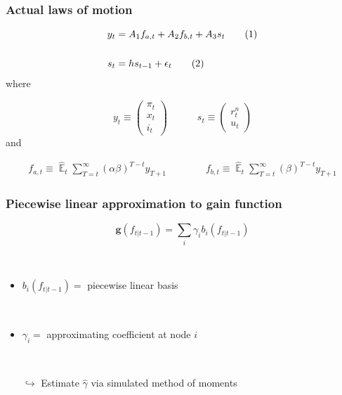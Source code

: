 \documentclass[10pt]{beamer}
\newcommand\numberthis{\addtocounter{equation}{1}\tag{\theequation}} %
\DeclareMathOperator{\E}{\mathbb{E}}
\begin{document}
\begin{frame}[plain]  %
	\frametitle{Actual laws of motion}
	\label{ALMs}

 \begin{align*}
y_t & = A_1 f_{a,t} + A_2 f_{b,t} + A_3 s_t \label{LOM_LR} \numberthis \\
\\
s_t & = h s_{t-1} + \epsilon_t \label{exog} \numberthis
\end{align*}
where

\begin{equation}
 y_t \equiv \begin{pmatrix} \pi_t \\ x_t \\ i_t
 \end{pmatrix} 
 \quad \quad \quad 
  s_t  \equiv \begin{pmatrix} r_t^n \\ u_t 
 \end{pmatrix} 
\end{equation}
and

  \begin{align}
f_{a,t}  \equiv  \hat{\E}_t\sum_{T=t}^{\infty} (\alpha\beta)^{T-t } y_{T+1} \quad \quad \quad \quad 
f_{b,t}  \equiv \hat{\E}_t\sum_{T=t}^{\infty} (\beta)^{T-t } y_{T+1} \label{fafb}
\end{align}

\hyperlink{aggregate_LOMS}{}	


\end{frame}

\begin{frame}[plain]  %
	\frametitle{Piecewise linear approximation to gain function}\label{estimation_details}



\begin{equation}
 \mathbf{g}(f_{t|t-1}) = \sum_i\gamma_i b_i(f_{t|t-1})
\end{equation}

\

\begin{itemize}
\item $ b_i(f_{t|t-1}) = $ piecewise linear basis

\

\item $\gamma_i  = $ approximating coefficient at node $i$

\

\item[$\hookrightarrow$] Estimate $\hat{\gamma}$ via simulated method of moments
\end{itemize}



\vfill


\hyperlink{estimation_general}{}	



\end{frame}
\end{document}

